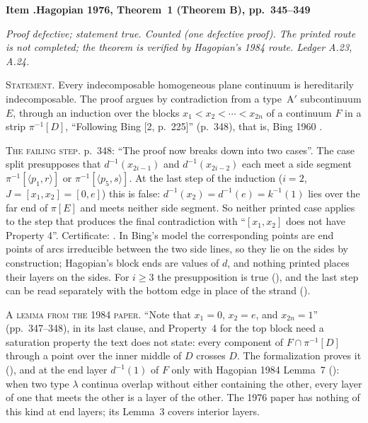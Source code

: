 \documentclass[11pt]{article}
\newcounter{defect}
\newenvironment{defect}[4]{%
  \par\addvspace{10pt}\refstepcounter{defect}%
  \noindent\textbf{Item \thedefect.\enspace #1}\par\nopagebreak
  \noindent\textit{#2}\par\nopagebreak\smallskip}{\par\addvspace{6pt}}
\newcommand{\fld}[1]{\par\noindent\textsc{#1.}\enspace}
\begin{document}
\begin{defect}{Hagopian 1976, Theorem~1 (Theorem B), pp.~345--349}{Proof defective; statement true.
Counted (one defective proof). The printed route is not completed; the theorem is verified by
Hagopian's 1984 route. Ledger A.23, A.24.}{0}{1}\label{it:h76}

\fld{Statement} Every indecomposable homogeneous plane continuum is hereditarily indecomposable.
The proof argues by contradiction from a type~A$'$ subcontinuum $E$, through an induction over the
blocks $x_1<x_2<\cdots<x_{2n}$ of a continuum $F$ in a strip $\pi^{-1}[D]$, ``Following Bing [2,
p.~225]'' (p.~348), that is, Bing 1960 \cite[pp.~225--227]{B60}.

\fld{The failing step} p.~348: ``The proof now breaks down into two cases''. The case split
presupposes that $d^{-1}(x_{2i-1})$ and $d^{-1}(x_{2i-2})$ each meet a side segment
$\pi^{-1}[\langle p_1,r\rangle]$ or $\pi^{-1}[\langle p_5,s\rangle]$. At the last step of the
induction ($i=2$, $J=[x_1,x_2]=[0,e]$) this is false: $d^{-1}(x_2)=d^{-1}(e)=k^{-1}(1)$ lies over
the far end of $\pi[E]$ and meets neither side segment. So neither printed case applies to the
step that produces the final contradiction with ``$[x_1,x_2]$ does not have Property 4''.
Certificate: . In Bing's model \cite[p.~226]{B60} the
corresponding points are end points of arcs irreducible between the two side lines, so they lie on
the sides by construction; Hagopian's block ends are values of $d$, and nothing printed places their
layers on the sides. For $i\ge3$ the presupposition is true (), and the
last step can be read separately with the bottom edge in place of the strand
().

\fld{A lemma from the 1984 paper} ``Note that $x_1=0$, $x_2=e$, and $x_{2n}=1$''
(pp.~347--348), in its last clause, and Property~4 for the top
block need a saturation property the text does not state: every component of $F\cap\pi^{-1}[D]$
through a point over the inner middle of $D$ crosses $D$. The formalization proves it
(), and at the end layer $d^{-1}(1)$ of $F$ only with Hagopian
1984 Lemma~7 (): when two type $\lambda$ continua overlap without either
containing the other, every layer of one that meets the other is a layer of the other. The 1976
paper has nothing of this kind at end layers; its Lemma~3 covers interior layers.


\end{defect}
\end{document}
